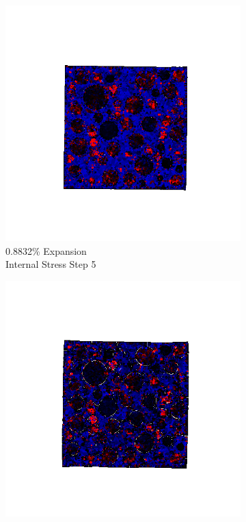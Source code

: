 \begin{figure}[h!]
    \begin{subfigure}{.25\textwidth}
      \centering
      \includegraphics[width=1.0\linewidth]{Files/exp_3D/ASR/A30P75_4_s5.png}
      \caption{0.8832\% Expansion\\Internal Stress Step 5}
    \end{subfigure}%
    \begin{subfigure}{.25\textwidth}
      \centering
      \includegraphics[width=1.0\linewidth]{Files/exp_3D/ASR/A30P75_4_s10.png}

\end{subfigure}
\end{figure}

